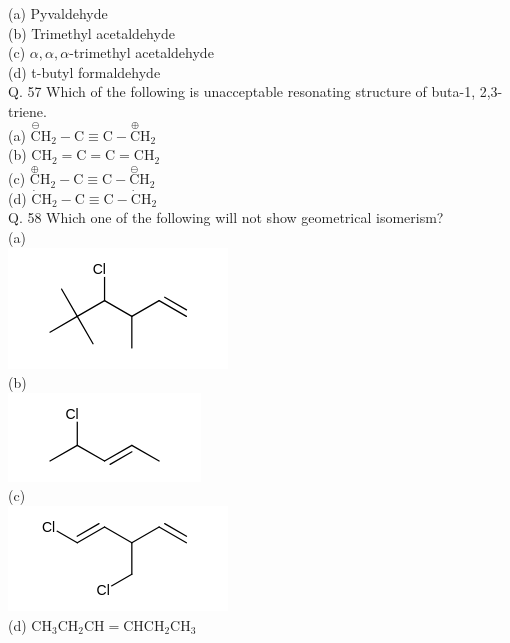 \documentclass[10pt]{article}
\begin{document}
(a) Pyvaldehyde\\
(b) Trimethyl acetaldehyde\\
(c) $\alpha, \alpha, \alpha$-trimethyl acetaldehyde\\
(d) t-butyl formaldehyde\\
Q. 57 Which of the following is unacceptable resonating structure of buta-1, 2,3-triene.\\
(a) $\stackrel{\ominus}{\mathrm{C}} \mathrm{H}_{2}-\mathrm{C} \equiv \mathrm{C}-\stackrel{\oplus}{\mathrm{C}} \mathrm{H}_{2}$\\
(b) $\mathrm{CH}_{2}=\mathrm{C}=\mathrm{C}=\mathrm{CH}_{2}$\\
(c) $\stackrel{\oplus}{\mathrm{C}} \mathrm{H}_{2}-\mathrm{C} \equiv \mathrm{C}-\stackrel{\ominus}{\mathrm{C}} \mathrm{H}_{2}$\\
(d) $\dot{\mathrm{C}} \mathrm{H}_{2}-\mathrm{C} \equiv \mathrm{C}-\dot{\mathrm{C}} \mathrm{H}_{2}$\\
Q. 58 Which one of the following will not show geometrical isomerism?\\
(a)\\
\includegraphics{smile-bf26248fa133f8397a9435528d6604f91cc92239}\\
(b)\\
\includegraphics{smile-d0c5b1f1abb9b5000510d9310472b041de075bd8}\\
(c)\\
\includegraphics{smile-c65599cb1b3083c843ad1efa5e931bfc1ca7236f}\\
(d) $\mathrm{CH}_{3} \mathrm{CH}_{2} \mathrm{CH}=\mathrm{CHCH}_{2} \mathrm{CH}_{3}$\\
\end{document}
